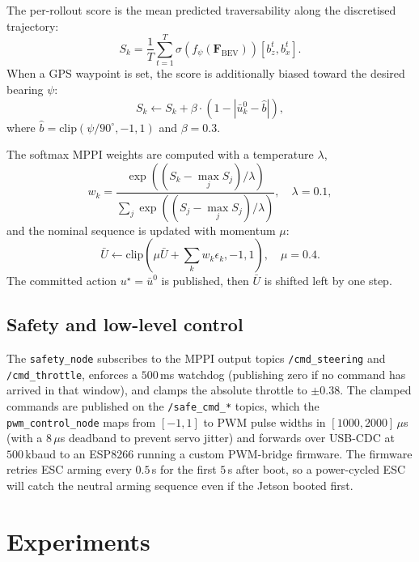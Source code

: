 \documentclass[conference]{IEEEtran}
\newcommand{\bev}{\mathbf{F}_{\mathrm{BEV}}}
\newcommand{\unet}{f_\psi}
\newcommand{\sigm}{\sigma}
\begin{document}
The per-rollout score is the mean predicted traversability along the
discretised trajectory:
\begin{equation}
  S_k = \frac{1}{T} \sum_{t=1}^{T} \sigm\!\left(\unet(\bev)\right)\!\left[b_z^t, b_x^t\right].
\end{equation}
When a GPS waypoint is set, the score is additionally biased toward the
desired bearing $\psi$:
\begin{equation}
  S_k \leftarrow S_k + \beta \cdot \left(1 - \left|\bar{u}_k^0 - \hat{b}\right|\right),
\end{equation}
where $\hat{b} = \text{clip}(\psi / 90^\circ, -1, 1)$ and $\beta = 0.3$.

The softmax MPPI weights are computed with a temperature $\lambda$,
\begin{equation}
  w_k = \frac{\exp\!\left((S_k - \max_j S_j) / \lambda\right)}
              {\sum_j \exp\!\left((S_j - \max_j S_j) / \lambda\right)},
              \quad \lambda = 0.1,
\end{equation}
and the nominal sequence is updated with momentum $\mu$:
\begin{equation}
  \bar{U} \leftarrow \text{clip}\!\left(\mu \bar{U} + \sum_k w_k \epsilon_k, -1, 1\right),
  \quad \mu = 0.4.
\end{equation}
The committed action $u^\star = \bar{u}^0$ is published, then $\bar{U}$ is
shifted left by one step.

\subsection{Safety and low-level control}

The \texttt{safety\_node} subscribes to the MPPI output topics
\texttt{/cmd\_steering} and \texttt{/cmd\_throttle}, enforces a $500$\,ms
watchdog (publishing zero if no command has arrived in that window), and
clamps the absolute throttle to $\pm 0.38$. The clamped commands are
published on the \texttt{/safe\_cmd\_*} topics, which the
\texttt{pwm\_control\_node} maps from $[-1, 1]$ to PWM pulse widths in
$[1000, 2000]\,\mu$s (with a $8\,\mu$s deadband to prevent servo jitter)
and forwards over USB-CDC at $500$\,kbaud to an ESP8266 running a custom
PWM-bridge firmware. The firmware retries ESC arming every $0.5$\,s for the
first $5$\,s after boot, so a power-cycled ESC will catch the neutral
arming sequence even if the Jetson booted first.

\section{Experiments}
\label{sec:eval}
\end{document}
